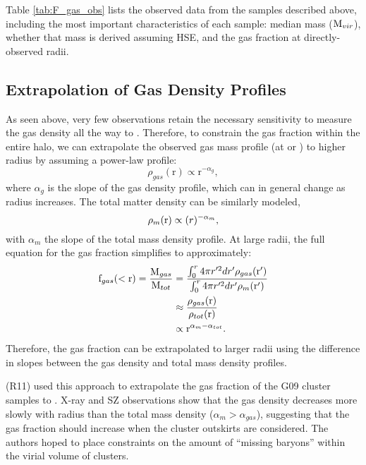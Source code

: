 Table \ref{tab:F_gas_obs} lists the observed data from the samples
described above, including the most important characteristics of each
sample: median mass ($\textrm{M\ensuremath{_{vir}}}$), whether that mass is derived
assuming HSE, and the gas fraction at directly-observed radii.



\subsection{Extrapolation of Gas Density Profiles}
\label{sec:Gas.Extrapolation}
As seen above, very few observations retain the necessary sensitivity to
measure the gas density all the way to \rvir{}. Therefore, to
constrain the gas fraction within the entire halo, we can extrapolate
the observed gas mass profile (at \rtwo{} or \rfive{}) to higher
radius by assuming a power-law profile:
\begin{equation}
\rho_{gas}(\textrm{r}) \propto \textrm{r}^{-\alpha_g}, \nonumber
\end{equation}
where $\alpha{}_g$ is the slope of the gas density profile, which can in
general change as radius increases. The total
matter density can be similarly modeled,
\begin{equation}
\rho_{m}(\textrm{r}) \propto \textrm(r)^{-\alpha_{m}}, \nonumber
\end{equation}
with $\alpha{}_m$ the slope of the total mass density profile. At
large radii, the full equation for the gas fraction simplifies to approximately:
\begin{align}
\textrm{f\ensuremath{_{gas}}}(<\textrm{r}) = \frac{\textrm{M}_{gas}}{\textrm{M}_{tot}} &=
\frac{\int_0^r 4\pi{}r'^2dr'\rho_{gas}(\textrm{r}')}{\int_0^r
  4\pi{}r'^2dr'\rho_{m}(\textrm{r}')} \nonumber \\ & \approx
\frac{\rho_{gas}(\textrm{r})}{\rho_{tot}(\textrm{r})} \nonumber\\ &\propto \textrm{r}^{\alpha_{m} - \alpha_{tot}}. \nonumber
\end{align}
Therefore, the gas fraction can be extrapolated to larger radii using
the difference in slopes between the gas density and total mass
density profiles.

\textbf{\citet{Rasheed2011}} (R11) used this approach to extrapolate
the gas fraction of the G09 cluster samples to \rvir{}. X-ray and SZ
observations show that the gas density decreases more slowly with
radius than the total mass density ($\alpha_{m} > \alpha_{gas}$),
suggesting that the gas fraction should increase when the cluster
outskirts are considered. The authors hoped to place constraints on
the amount of ``missing baryons'' within the virial volume of
clusters.

